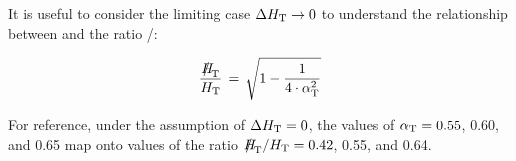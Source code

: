 It is useful to consider the limiting case $\Delta\mbox{$H_\text{T}$} \rightarrow 0$ to
understand the relationship between \alphat and the ratio \mht/\scalht:

\begin{equation}
  \label{eq:alphat3}
  \frac{\mht}{\scalht} \, = \, \sqrt{ 1 - \frac{1}{4 \cdot \alphat^2} }
\end{equation}

For reference, under the assumption of $\Delta\mbox{$H_\text{T}$} = 0$, the values of
$\alpha_{\text{T}} = 0.55$, 0.60, and 0.65 map onto values of the ratio
$\mht/\scalht = 0.42$, 0.55, and 0.64.


